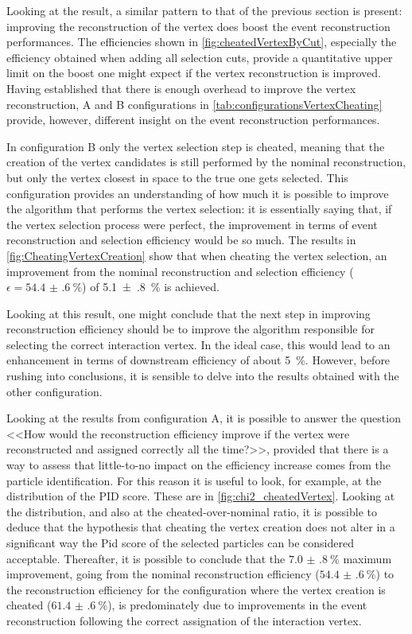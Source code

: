 Looking at the result, a similar pattern to that of the previous section is present: improving the reconstruction of the vertex does boost the event reconstruction performances. The efficiencies shown in \autoref{fig:cheatedVertexByCut}, especially the efficiency obtained when adding all selection cuts, provide a quantitative upper limit on the boost one might expect if the vertex reconstruction is improved. Having established that there is enough overhead to improve the vertex reconstruction, A and B configurations in \autoref{tab:configurationsVertexCheating} provide, however, different insight on the event reconstruction performances. 

In configuration B only the vertex selection step is cheated, meaning that the creation of the vertex candidates is still performed by the nominal reconstruction, but only the vertex closest in space to the true one gets selected. This configuration provides an understanding of how much it is possible to improve the algorithm that performs the vertex selection: it is essentially saying that, if the vertex selection process were perfect, the improvement in terms of event reconstruction and selection efficiency would be so much. The results in \autoref{fig:CheatingVertexCreation} show that when cheating the vertex selection, an improvement from the nominal reconstruction and selection efficiency ($\epsilon = \SI{54.4(6)}{\percent}$) of \SI{5.1(8)}{\percent} is achieved. 

Looking at this result, one might conclude that the next step in improving reconstruction efficiency should be to improve the algorithm responsible for selecting the correct interaction vertex. In the ideal case, this would lead to an enhancement in terms of downstream efficiency of about \SI{5}{\percent}. However, before rushing into conclusions, it is sensible to delve into the results obtained with the other configuration. 

Looking at the results from configuration A, it is possible to answer the question <<How would the reconstruction efficiency improve if the vertex were reconstructed and assigned correctly all the time?>>, provided that there is a way to assess that little-to-no impact on the efficiency increase comes from the particle identification. For this reason it  is useful to look, for example, at the distribution of the PID score. These are in \autoref{fig:chi2_cheatedVertex}. Looking at the distribution, and also at the cheated-over-nominal ratio, it is possible to deduce that the hypothesis that cheating the vertex creation does not alter in a significant way the Pid score of the selected particles can be considered acceptable. Thereafter, it is possible to conclude that the $\SI{7.0(8)}{\percent}$ maximum improvement, going from the nominal reconstruction efficiency ($\SI{54.4(6)}{\percent}$) to the reconstruction efficiency for the configuration where the vertex creation is cheated ($\SI{61.4(6)}{\percent}$), is predominately due to improvements in the event reconstruction following the correct assignation of the interaction vertex. 

